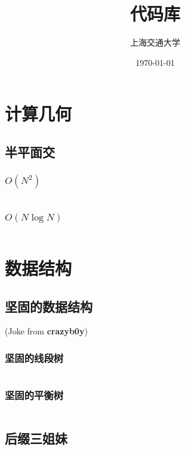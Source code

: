\documentclass[a4paper]{article}
\title{代码库}
\author{上海交通大学}
\date{\today}
\newcommand{\cppcode}[1]{
    \inputminted[mathescape]{cpp}{source/#1}
}
\begin{document}
\maketitle

\tableofcontents

\clearpage

\section{计算几何}

\subsection{半平面交}

\subsubsection{$O(N^2)$}

\cppcode{half-plane-intersection-n2.cpp}

\subsubsection{$O(N \log N)$}

\cppcode{half-plane-intersection-nlogn.cpp}

\section{数据结构}

\subsection{坚固的数据结构}

(Joke from \textbf{crazyb0y}) 

\subsubsection{坚固的线段树}

\cppcode{persistent-segment-tree.cpp}

\subsubsection{坚固的平衡树}

\cppcode{persistent-treap.cpp}

\subsection{后缀三姐妹}
\end{document}
